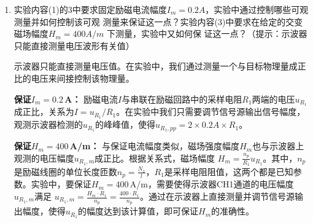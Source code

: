 \documentclass[12pt]{article}
\newcommand{\question}[1]{{\CJKfamily{kaishu}#1}}
\begin{document}
\begin{enumerate}
\begin{itemize}
        \item \textbf{优势：} 基于法拉第电磁感应定律，原理清晰。线圈结构简单，易于制作。灵敏度可通过增加匝数来方便调节。
        \item \textbf{局限：} 该方法本质上测量的是磁通量的变化率($d\Phi/dt$)只能直接测量交变磁场或变化的磁场。对于静态磁场，必须通过移动或翻转线圈来产生磁通量变化才能测量。此外，测量结果依赖于后续的积分电路，积分电路的条件满足不好会直接影响测量。
    \end{itemize}
    \item \question{实验内容(1)的3中要求固定励磁电流幅度$I_m=0.2 A$，实验中通过控制哪些可观测量并如何控制该可观
    测量来保证这一点？实验内容(3)中要求在给定的交变磁场幅度$H_m=400 A/m$ 下测量，实验中又如何保
    证这一点？（提示：示波器只能直接测量电压波形有关值）}
    \par
    \hspace{1em}示波器只能直接测量电压值。在实验中，我们通过测量一个与目标物理量成正比的电压来间接控制该物理量。
    \par
    \hspace{1em}\textbf{保证$I_m=0.2$\,A：} 励磁电流$I$与串联在励磁回路中的采样电阻$R_1$两端的电压$u_{R_1}$成正比，关系为$I=u_{R_1}/{R_1}$。在实验中我们只需要调节信号源输出信号幅度，观测示波器检测的$u_{R_1}$的峰峰值，使得$u_{R_1,pp}=2\times 0.2A\times R_1$。
    \par
    \hspace{1em}\textbf{保证$H_m=400$\,A/m：} 与保证电流幅度类似，磁场强度幅度$H_m$也与示波器上观测的电压幅度$u_{R_1,m}$成正比。根据关系式，磁场幅度 $H_m = \frac{n_p}{R_1}u_{R_1}$。其中，$n_p$是励磁线圈的单位长度匝数$n_p=\frac{N_1}{l}$，$R_1$是采样电阻阻值，这两个都是已知参数。实验中，要保证$H_m=400$\,A/m，需要使得示波器CH1通道的电压幅度$u_{R_1,m}$满足 $u_{R_1,m} = \frac{H_m \cdot R_1}{n_p} = \frac{400 \cdot R_1}{n_p}$。通过在示波器上直接测量并调节信号源输出幅度，使得$u_{R_1}$的幅度达到该计算值，即可保证$H_m$的准确性。
\end{enumerate}
\end{document}
